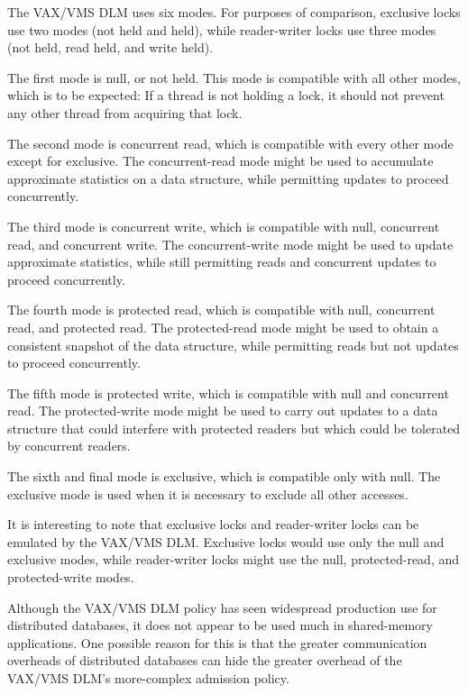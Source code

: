 The VAX/VMS DLM uses six modes.
For purposes of comparison, exclusive
locks use two modes (not held and held), while reader-writer locks
use three modes (not held, read held, and write held).

The first mode is null, or not held.
This mode is compatible with all other modes, which is to be expected:
If a thread is not holding a lock, it should not prevent any
other thread from acquiring that lock.

The second mode is concurrent read, which is compatible with every other
mode except for exclusive.
The concurrent-read mode might be used to accumulate approximate
statistics on a data structure, while permitting updates to proceed
concurrently.

The third mode is concurrent write, which is compatible with null,
concurrent read, and concurrent write.
The concurrent-write mode might be used to update approximate statistics,
while still permitting reads and concurrent updates to proceed
concurrently.

The fourth mode is protected read, which is compatible with null,
concurrent read, and protected read.
The protected-read mode might be used to obtain a consistent snapshot
of the data structure, while permitting reads but not updates to
proceed concurrently.

The fifth mode is protected write, which is compatible with null and
concurrent read.
The protected-write mode might be used to carry out updates to a data
structure that could interfere with protected readers but which could
be tolerated by concurrent readers.

The sixth and final mode is exclusive, which is compatible only with null.
The exclusive mode is used when it is necessary to exclude all other accesses.

It is interesting to note that exclusive locks and reader-writer locks
can be emulated by the VAX/VMS DLM\@.
Exclusive locks would use only the null and exclusive modes, while
reader-writer locks might use the null, protected-read, and
protected-write modes.

\QuickQuizEnd

Although the VAX/VMS DLM policy has seen widespread production use
for distributed databases, it does not appear to be used much in
shared-memory applications.
One possible reason for this is that the greater communication overheads
of distributed databases can hide the greater overhead of the
VAX/VMS DLM's more-complex admission policy.

